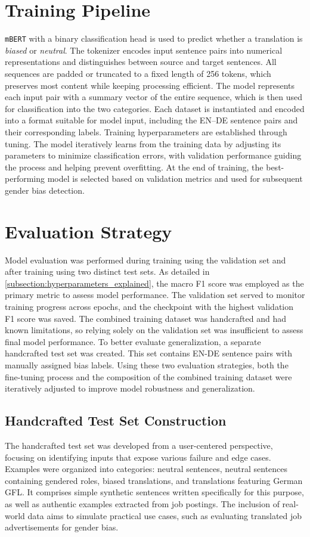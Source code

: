 \section{Training Pipeline}
    \texttt{mBERT} with a binary classification head is used to predict whether a translation is \textit{biased} or \textit{neutral}. The tokenizer encodes input sentence pairs into numerical representations and distinguishes between source and target sentences. All sequences are padded or truncated to a fixed length of 256 tokens, which preserves most content while keeping processing efficient. The model represents each input pair with a summary vector of the entire sequence, which is then used for classification into the two categories. Each dataset is instantiated and encoded into a format suitable for model input, including the EN–DE sentence pairs and their corresponding labels. Training hyperparameters are established through tuning. The model iteratively learns from the training data by adjusting its parameters to minimize classification errors, with validation performance guiding the process and helping prevent overfitting. At the end of training, the best-performing model is selected based on validation metrics and used for subsequent gender bias detection.

\section{Evaluation Strategy}
    Model evaluation was performed during training using the validation set and after training using two distinct test sets. As detailed in \autoref{subsection:hyperparameters_explained}, the macro F1 score was employed as the primary metric to assess model performance. The validation set served to monitor training progress across epochs, and the checkpoint with the highest validation F1 score was saved. The combined training dataset was handcrafted and had known limitations, so relying solely on the validation set was insufficient to assess final model performance. To better evaluate generalization, a separate handcrafted test set was created. This set contains EN-DE sentence pairs with manually assigned bias labels. Using these two evaluation strategies, both the fine-tuning process and the composition of the combined training dataset were iteratively adjusted to improve model robustness and generalization.

\subsection{Handcrafted Test Set Construction} \label{subsection:eval_dataset}
    The handcrafted test set was developed from a user-centered perspective, focusing on identifying inputs that expose various failure and edge cases. Examples were organized into categories: neutral sentences, neutral sentences containing gendered roles, biased translations, and translations featuring German GFL. It comprises simple synthetic sentences written specifically for this purpose, as well as authentic examples extracted from job postings. The inclusion of real-world data aims to simulate practical use cases, such as evaluating translated job advertisements for gender bias.

